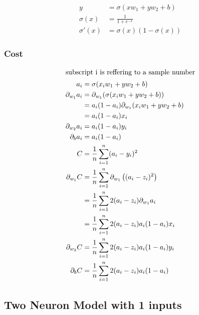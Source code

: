 \documentclass{article}
\begin{document}
\begin{align}
    y &= \sigma(xw_1 + yw_2 + b) \\
    \sigma(x) &= \frac{1}{1 + e^{-x}} \\
    \sigma'(x) &= \sigma(x)(1 - \sigma(x)) 
\end{align}

\newpage

\subsubsection{Cost}

\def\pd[#1]{\partial_{#1}}
\def\avgsum[#1,#2]{\frac{1}{#2}\sum_{#1=1}^{#2}}

\begin{align}
    \shortintertext{subscript i is reffering to a sample number}
    a_i &= \sigma(x_iw_1 + yw_2 +b) \\
    \pd[w_1]a_i 
        &= \pd[w_1](\sigma(x_iw_1 + yw_2 + b)) \\
        &= a_i(1 - a_i)\pd[w_1](x_iw_1 + yw_2 + b) \\
        &= a_i(1 - a_i)x_i \\
    \pd[w_2]a_i
        &= a_i(1 - a_i)y_i \\
    \pd[b]a_i
        &= a_i(1 - a_i) \\
    C &= \avgsum[i,n](a_i - y_i)^2 \\
    \pd[w_1]C 
        &= \avgsum[i, n]\pd[w_1]\left((a_i - z_i)^2\right) \\
        &= \avgsum[i, n]2(a_i - z_i)\pd[w_1]a_i \\
        &= \avgsum[i, n]2(a_i - z_i)a_i(1 - a_i)x_i \\
    \pd[w_2]C
        &= \avgsum[i, n]2(a_i - z_i)a_i(1 - a_i)y_i \\
    \pd[b]C
        &= \avgsum[i, n]2(a_i - z_i)a_i(1 - a_i)
\end{align}

\subsection{Two Neuron Model with 1 inputs}

\def\d{2.0}
\def\s[#1]{^{(#1)}}
\begin{center}
\end{center}
\end{document}
